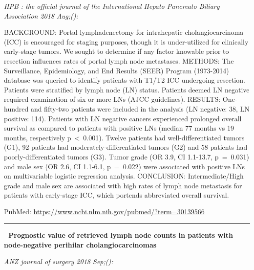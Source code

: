 \documentclass[]{article}
\begin{document}
\emph{HPB : the official journal of the International Hepato Pancreato
Biliary Association 2018 Aug;():}

BACKGROUND: Portal lymphadenectomy for intrahepatic cholangiocarcinoma
(ICC) is encouraged for staging purposes, though it is under-utilized
for clinically early-stage tumors. We sought to determine if any factor
knowable prior to resection influences rates of portal lymph node
metastases. METHODS: The Surveillance, Epidemiology, and End Results
(SEER) Program (1973-2014) database was queried to identify patients
with T1/T2 ICC undergoing resection. Patients were stratified by lymph
node (LN) status. Patients deemed LN negative required examination of
six or more LNs (AJCC guidelines). RESULTS: One-hundred and fifty-two
patients were included in the analysis (LN negative: 38, LN positive:
114). Patients with LN negative cancers experienced prolonged overall
survival as compared to patients with positive LNs (median 77 months vs
19 months, respectively p~\textless{}~0.001). Twelve patients had
well-differentiated tumors (G1), 92 patients had
moderately-differentiated tumors (G2) and 58 patients had
poorly-differentiated tumors (G3). Tumor grade (OR 3.9, CI 1.1-13.7,
p~=~0.031) and male sex (OR 2.6, CI 1.1-6.1, p~=~0.022) were associated
with positive LNs on multivariable logistic regression analysis.
CONCLUSION: Intermediate/High grade and male sex are associated with
high rates of lymph node metastasis for patients with early-stage ICC,
which portends abbreviated overall survival.

PubMed: \url{https://www.ncbi.nlm.nih.gov/pubmed/?term=30139566}

{}

{}

\begin{center}\rule{0.5\linewidth}{\linethickness}\end{center}

 - \textbf{Prognostic value of retrieved lymph node counts in patients
with node-negative perihilar cholangiocarcinomas}

\emph{ANZ journal of surgery 2018 Sep;():}
\end{document}
